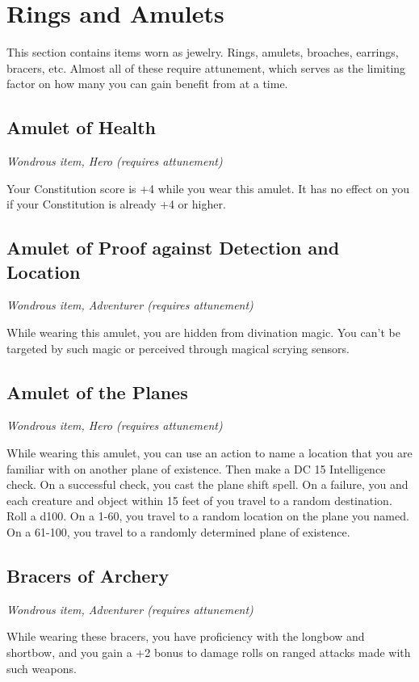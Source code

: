 \section{Rings and Amulets}\label{mi:rings}

This section contains items worn as jewelry. Rings, amulets, broaches, earrings, bracers, etc. Almost all of these require attunement, which serves as the limiting factor on how many you can gain benefit from at a time.

\subsection{Amulet of Health}
\textit{Wondrous item, Hero (requires attunement)}

Your Constitution score is +4 while you wear this amulet. It has no effect on you if your Constitution is already +4 or higher.

\subsection{Amulet of Proof against Detection and Location}
\textit{Wondrous item, Adventurer (requires attunement)}

While wearing this amulet, you are hidden from divination magic. You can't be targeted by such magic or perceived through magical scrying sensors.

\subsection{Amulet of the Planes}
\textit{Wondrous item, Hero (requires attunement)}

While wearing this amulet, you can use an action to name a location that you are familiar with on another plane of existence. Then make a DC 15 Intelligence check. On a successful check, you cast the plane shift spell. On a failure, you and each creature and object within 15 feet of you travel to a random destination. Roll a d100. On a 1-60, you travel to a random location on the plane you named. On a 61-100, you travel to a randomly determined plane of existence.

\subsection{Bracers of Archery}
\textit{Wondrous item, Adventurer (requires attunement)}

While wearing these bracers, you have proficiency with the longbow and shortbow, and you gain a +2 bonus to damage rolls on ranged attacks made with such weapons.

